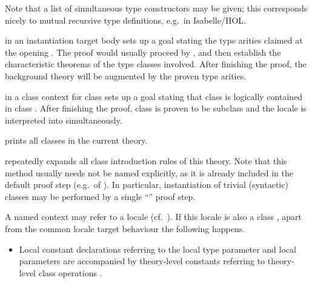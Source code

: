 \begin{isabellebody}
\begin{isamarkuptext}
\begin{descr}
  Note that a list of simultaneous type constructors may be given;
  this corresponds nicely to mutual recursive type definitions, e.g.\
  in Isabelle/HOL.

  \item [\mbox{\isa{\isacommand{instance}}}] in an instantiation target body sets
  up a goal stating the type arities claimed at the opening \mbox{}.  The proof would usually proceed by \mbox{}, and then establish the characteristic theorems of
  the type classes involved.  After finishing the proof, the
  background theory will be augmented by the proven type arities.

  \item [\mbox{\isa{\isacommand{subclass}}}~] in a class context for class
   sets up a goal stating that class  is logically
  contained in class .  After finishing the proof, class
  \isa{d} is proven to be subclass  and the locale \isa{c} is interpreted into  simultaneously.

  \item [\mbox{\isa{\isacommand{print{\isacharunderscore}classes}}}] prints all classes in the current
  theory.

  \item [\mbox{\isa{intro{\isacharunderscore}classes}}] repeatedly expands all class
  introduction rules of this theory.  Note that this method usually
  needs not be named explicitly, as it is already included in the
  default proof step (e.g.\ of \mbox{\isa{\isacommand{proof}}}).  In particular,
  instantiation of trivial (syntactic) classes may be performed by a
  single ``\mbox{\isa{\isacommand{{\isachardot}{\isachardot}}}}'' proof step.

  \end{descr}%
\end{isamarkuptext}%
\isamarkuptrue%
%
\isamarkuptrue%
%
\begin{isamarkuptext}%

  A named context may refer to a locale (cf.\ ).
  If this locale is also a class \isa{c}, apart from the common
  locale target behaviour the following happens.

  \begin{itemize}

  \item Local constant declarations  referring to the
  local type parameter \isa{{\isasymalpha}} and local parameters 
  are accompanied by theory-level constants 
  referring to theory-level class operations \isa{f{\isacharbrackleft}{\isacharquery}{\isasymalpha}\ {\isacharcolon}{\isacharcolon}\ c{\isacharbrackright}}.


\end{itemize}
\end{isamarkuptext}
\end{isabellebody}
